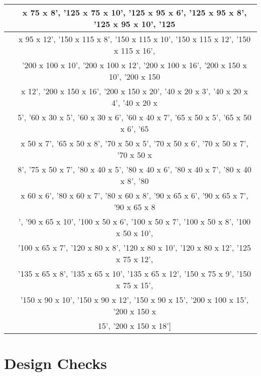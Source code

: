 \documentclass{article}%
\begin{document}
\begin{longtable}{|p{8cm}|p{8cm}|}
\hline%
\hline%
\multicolumn{1}{|c|}{ }&\multicolumn{1}{|c|}{ x 75 x 8', '125 x 75 x 10', '125 x 95 x 6', '125 x 95 x 8', '125 x 95 x 10', '125 }\\%
\hline%
\hline%
\multicolumn{1}{|c|}{ }&\multicolumn{1}{|c|}{x 95 x 12', '150 x 115 x 8', '150 x 115 x 10', '150 x 115 x 12', '150 x 115 x 16', }\\%
\hline%
\hline%
\multicolumn{1}{|c|}{ }&\multicolumn{1}{|c|}{'200 x 100 x 10', '200 x 100 x 12', '200 x 100 x 16', '200 x 150 x 10', '200 x 150 }\\%
\hline%
\hline%
\multicolumn{1}{|c|}{ }&\multicolumn{1}{|c|}{x 12', '200 x 150 x 16', '200 x 150 x 20', '40 x 20 x 3', '40 x 20 x 4', '40 x 20 x}\\%
\hline%
\hline%
\multicolumn{1}{|c|}{ }&\multicolumn{1}{|c|}{ 5', '60 x 30 x 5', '60 x 30 x 6', '60 x 40 x 7', '65 x 50 x 5', '65 x 50 x 6', '65}\\%
\hline%
\hline%
\multicolumn{1}{|c|}{ }&\multicolumn{1}{|c|}{ x 50 x 7', '65 x 50 x 8', '70 x 50 x 5', '70 x 50 x 6', '70 x 50 x 7', '70 x 50 x }\\%
\hline%
\hline%
\multicolumn{1}{|c|}{ }&\multicolumn{1}{|c|}{8', '75 x 50 x 7', '80 x 40 x 5', '80 x 40 x 6', '80 x 40 x 7', '80 x 40 x 8', '80 }\\%
\hline%
\hline%
\multicolumn{1}{|c|}{ }&\multicolumn{1}{|c|}{x 60 x 6', '80 x 60 x 7', '80 x 60 x 8', '90 x 65 x 6', '90 x 65 x 7', '90 x 65 x 8}\\%
\hline%
\hline%
\multicolumn{1}{|c|}{ }&\multicolumn{1}{|c|}{', '90 x 65 x 10', '100 x 50 x 6', '100 x 50 x 7', '100 x 50 x 8', '100 x 50 x 10',}\\%
\hline%
\hline%
\multicolumn{1}{|c|}{ }&\multicolumn{1}{|c|}{ '100 x 65 x 7', '120 x 80 x 8', '120 x 80 x 10', '120 x 80 x 12', '125 x 75 x 12',}\\%
\hline%
\hline%
\multicolumn{1}{|c|}{ }&\multicolumn{1}{|c|}{ '135 x 65 x 8', '135 x 65 x 10', '135 x 65 x 12', '150 x 75 x 9', '150 x 75 x 15',}\\%
\hline%
\hline%
\multicolumn{1}{|c|}{ }&\multicolumn{1}{|c|}{ '150 x 90 x 10', '150 x 90 x 12', '150 x 90 x 15', '200 x 100 x 15', '200 x 150 x }\\%
\hline%
\hline%
\multicolumn{1}{|c|}{ }&\multicolumn{1}{|c|}{15', '200 x 150 x 18'{]}}\\%
\hline%
\end{longtable}

%
%
\newpage%
\section{Design Checks}%
\label{sec:DesignChecks}%
\end{document}
